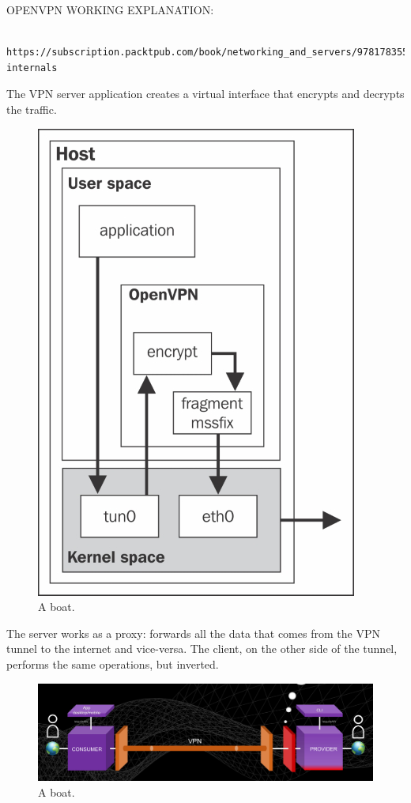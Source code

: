 \documentclass[]{article}
\begin{document}
	


	OPENVPN WORKING EXPLANATION: 
	
	\begin{verbatim}
		https://subscription.packtpub.com/book/networking_and_servers/9781783553136/1/ch01lvl1sec12/openvpn-internals
	\end{verbatim}

	The VPN server application creates a virtual interface that encrypts and decrypts the traffic.

	\begin{figure}
		\centering
		\includegraphics{"images/openvpn_tun_interface.jpg"}
		\caption{A boat.}
		\label{fig:boat1}
	\end{figure}

	The server works as a proxy: forwards all the data that comes from the VPN tunnel to the internet and vice-versa.
	The client, on the other side of the tunnel, performs the same operations, but inverted. 

	\begin{figure}
		\includegraphics[width=\linewidth]{"images/client_server_vpn_connection.png"}
		\caption{A boat.}
		\label{fig:boat1}
	\end{figure}
\end{document}
